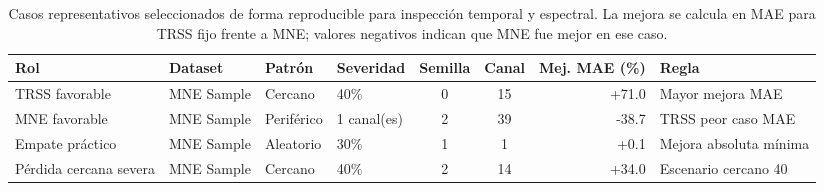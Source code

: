 \begin{table}[htbp]
\centering
\scriptsize
\setlength{\tabcolsep}{2pt}
\caption{Casos representativos seleccionados de forma reproducible para inspección temporal y espectral. La mejora se calcula en MAE para TRSS fijo frente a MNE; valores negativos indican que MNE fue mejor en ese caso.}
\label{tab:ch4_representative_cases}
\begin{tabular}{@{}p{2.0cm}p{1.45cm}p{1.35cm}p{1.25cm}ccrp{2.2cm}@{}}
\toprule
Rol & Dataset & Patrón & Severidad & Semilla & Canal & Mej. MAE (\%) & Regla \\
\midrule
TRSS favorable & MNE Sample & Cercano & 40\% & 0 & 15 & +71.0 & Mayor mejora MAE \\
MNE favorable & MNE Sample & Periférico & 1 canal(es) & 2 & 39 & -38.7 & TRSS peor caso MAE \\
Empate práctico & MNE Sample & Aleatorio & 30\% & 1 & 1 & +0.1 & Mejora absoluta mínima \\
Pérdida cercana severa & MNE Sample & Cercano & 40\% & 2 & 14 & +34.0 & Escenario cercano 40\\%
\bottomrule
\end{tabular}
\end{table}
